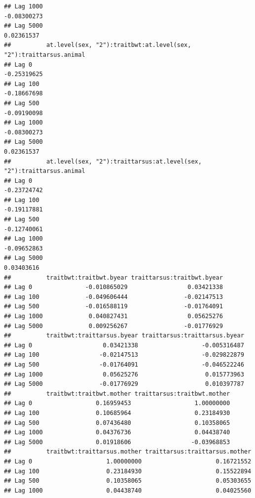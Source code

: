 \documentclass[
  12pt,
]{book}
\begin{document}
\begin{verbatim}
## Lag 1000                                                       -0.08300273
## Lag 5000                                                        0.02361537
##          at.level(sex, "2"):traitbwt:at.level(sex, "2"):traittarsus.animal
## Lag 0                                                          -0.25319625
## Lag 100                                                        -0.18667698
## Lag 500                                                        -0.09190098
## Lag 1000                                                       -0.08300273
## Lag 5000                                                        0.02361537
##          at.level(sex, "2"):traittarsus:at.level(sex, "2"):traittarsus.animal
## Lag 0                                                             -0.23724742
## Lag 100                                                           -0.19117881
## Lag 500                                                           -0.12740061
## Lag 1000                                                          -0.09652863
## Lag 5000                                                           0.03403616
##          traitbwt:traitbwt.byear traittarsus:traitbwt.byear
## Lag 0               -0.010865029                 0.03421338
## Lag 100             -0.049606444                -0.02147513
## Lag 500             -0.016588119                -0.01764091
## Lag 1000             0.040827431                 0.05625276
## Lag 5000             0.009256267                -0.01776929
##          traitbwt:traittarsus.byear traittarsus:traittarsus.byear
## Lag 0                    0.03421338                  -0.005316487
## Lag 100                 -0.02147513                  -0.029822879
## Lag 500                 -0.01764091                  -0.046522246
## Lag 1000                 0.05625276                   0.015773963
## Lag 5000                -0.01776929                   0.010397787
##          traitbwt:traitbwt.mother traittarsus:traitbwt.mother
## Lag 0                  0.16959453                  1.00000000
## Lag 100                0.10685964                  0.23184930
## Lag 500                0.07436480                  0.10358065
## Lag 1000               0.04376736                  0.04438740
## Lag 5000               0.01918606                 -0.03968853
##          traitbwt:traittarsus.mother traittarsus:traittarsus.mother
## Lag 0                     1.00000000                     0.16721552
## Lag 100                   0.23184930                     0.15522894
## Lag 500                   0.10358065                     0.05303655
## Lag 1000                  0.04438740                     0.04025560

\end{verbatim}
\end{document}

